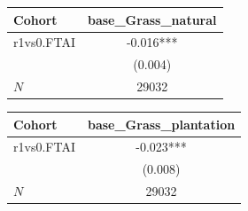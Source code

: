 {
\def\sym#1{\ifmmode^{#1}\else\(^{#1}\)\fi}
\begin{tabular}{l*{1}{c}}
\toprule
Cohort    &base\_Grass\_natural   \\
\midrule
r1vs0.FTAI&   -0.016***\\
          &  (0.004)   \\
\midrule
\(N\)     &    29032   \\
\bottomrule
\end{tabular}
}
{
\def\sym#1{\ifmmode^{#1}\else\(^{#1}\)\fi}
\begin{tabular}{l*{1}{c}}
\toprule
Cohort    &base\_Grass\_plantation   \\
\midrule
r1vs0.FTAI&   -0.023***\\
          &  (0.008)   \\
\midrule
\(N\)     &    29032   \\
\bottomrule
\end{tabular}
}
